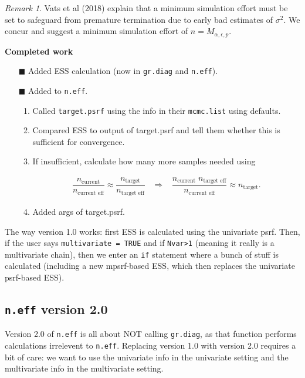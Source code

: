 \documentclass[12pt]{article}
\theoremstyle{remark}
\newtheorem{remark}{Remark}
\begin{document}
\begin{remark}
	\label{rem:minimum_effort}
Vats et al (2018) explain that a minimum simulation effort must be set to safeguard from premature termination due to early bad estimates of $\sigma^2$. We concur and  suggest  a minimum simulation effort of $n = M_{\alpha, \epsilon,p}$. \\
\end{remark}

\textbf{Completed work} %


\begin{itemize}
 \renewcommand{\labelitemi}{$\square$}
\item[$\blacksquare$]  Added ESS calculation (now in \texttt{gr.diag} and \texttt{n.eff}).
\item[$\blacksquare$]  Added to \texttt{n.eff}. 
\begin{enumerate}
\item Called \texttt{target.psrf} using the info in their \texttt{mcmc.list} using  defaults.
\item Compared ESS to output of target.psrf and tell them whether this is sufficient for convergence.
\item If insufficient, calculate how many more samples needed using


\begin{align*}
\dfrac{n_\text{current}}{n_{ \text{current eff}}} \approx \dfrac{n_{\text{target}}}{n_{ \text{target eff}}}
\;\;\;  \Longrightarrow \;\;\;
 \dfrac{n_{\text{current}} \; n_{ \text{target eff}}}{n_{ \text{current eff}}}  \approx n_{\text{target}}.
\end{align*}
\item Added args of target.psrf.
\end{enumerate}
\end{itemize}

The way version 1.0 works: first ESS is calculated using the univariate psrf. Then, if the user says \texttt{multivariate = TRUE} and if \texttt{Nvar>1} (meaning it really is a multivariate chain), then we enter an \texttt{if} statement where a bunch of stuff is calculated (including a new mpsrf-based ESS, which then replaces the univariate psrf-based ESS).

\subsection{\texttt{n.eff} version 2.0} %
Version 2.0 of \texttt{n.eff} is all about NOT calling \texttt{gr.diag}, as that function performs calculations irrelevent to \texttt{n.eff}. Replacing version 1.0 with version 2.0 requires a bit of care: we want to use the univariate info in the univariate setting and the multivariate info in the multivariate setting.
\end{document}
